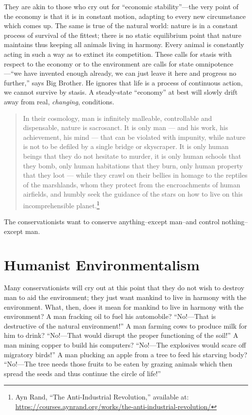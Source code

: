 \documentclass[11pt]{article}
\begin{document}
They are akin to those who cry out for ``economic stability''---the very point of the economy is that it is in constant motion, adapting to every new circumstance which comes up. The same is true of the natural world: nature is in a constant process of survival of the fittest; there is no static equilibrium point that nature maintains thus keeping all animals living in harmony. Every animal is constantly acting in such a way as to extinct its competition. These calls for stasis with respect to the economy or to the environment are calls for state omnipotence---``we have invented enough already, we can just leave it here and progress no further,'' says Big Brother. He ignores that life is a process of continuous action, we cannot survive by stasis. A steady-state ``economy'' at best will slowly drift away from real, \emph{changing}, conditions.

\begin{quote}
In their cosmology, man is infinitely malleable, controllable and dispensable, nature is sacrosanct. It is only man --- and his work, his achievement, his mind --- that can be violated with impunity, while nature is not to be defiled by a single bridge or skyscraper. It is only human beings that they do not hesitate to murder, it is only human schools that they bomb, only human habitations that they burn, only human property that they loot --- while they crawl on their bellies in homage to the reptiles of the marshlands, whom they protect from the encroachments of human airfields, and humbly seek the guidance of the stars on how to live on this incomprehensible planet.\footnote{Ayn Rand, ``The Anti-Industrial Revolution,'' available at: \url{https://courses.aynrand.org/works/the-anti-industrial-revolution/}}
\end{quote}

The conservationists want to conserve anything--except man--and control nothing--except man.

\section{Humanist Environmentalism}
\label{sec:org637488c}
Many conservationists will cry out at this point that they do not wish to destroy man to aid the environment; they just want mankind to live in harmony with the environment. What, then, does it mean for mankind to live in harmony with the environment? A man fracking oil to fuel his automobile? ``No!---That is destructive of the natural environment!'' A man farming cows to produce milk for him to drink? ``No!---That would disrupt the proper functioning of the soil!'' A man mining copper to build his computers? ``No!---The explosives would scare off migratory birds!'' A man plucking an apple from a tree to feed his starving body? ``No!---The tree needs those fruits to be eaten by grazing animals which then spread the seeds and thus continue the circle of life!''
\end{document}
